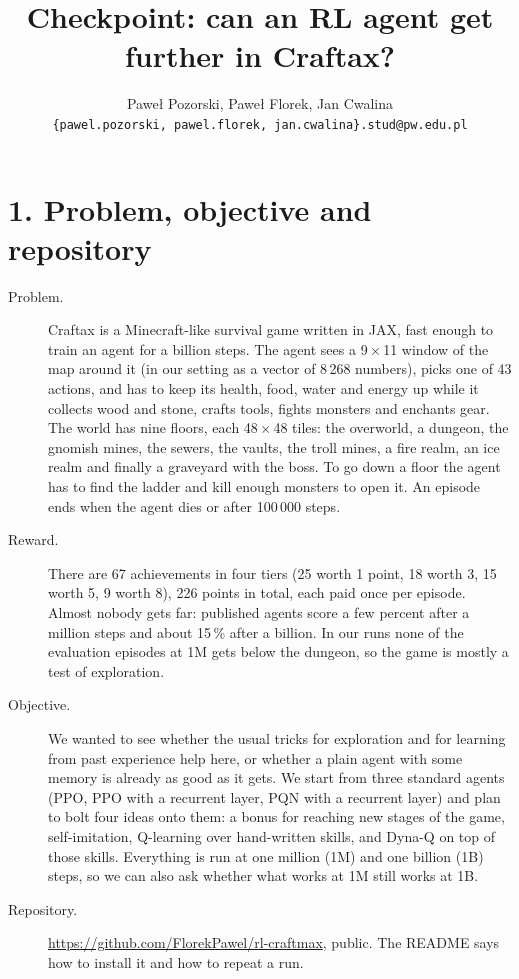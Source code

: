 \documentclass[10pt,a4paper]{article}
\title{Checkpoint: can an RL agent get further in Craftax?}
\author{Pawe{\l} Pozorski, Pawe{\l} Florek, Jan Cwalina\\{\small\texttt{\{pawel.pozorski, pawel.florek, jan.cwalina\}.stud@pw.edu.pl}}}
\date{}
\begin{document}
\small
\maketitle
\vspace{-1.6em}

\section*{1. Problem, objective and repository}

\begin{description}
\item[Problem.] Craftax is a Minecraft-like survival game written in JAX, fast enough to train an agent for a billion steps. The agent sees a 9\,$\times$\,11 window of the map around it (in our setting as a vector of 8\,268 numbers), picks one of 43 actions, and has to keep its health, food, water and energy up while it collects wood and stone, crafts tools, fights monsters and enchants gear. The world has nine floors, each 48\,$\times$\,48 tiles: the overworld, a dungeon, the gnomish mines, the sewers, the vaults, the troll mines, a fire realm, an ice realm and finally a graveyard with the boss. To go down a floor the agent has to find the ladder and kill enough monsters to open it. An episode ends when the agent dies or after 100\,000 steps.
\item[Reward.] There are 67 achievements in four tiers (25 worth 1 point, 18 worth 3, 15 worth 5, 9 worth 8), 226 points in total, each paid once per episode. Almost nobody gets far: published agents score a few percent after a million steps and about 15\,\% after a billion. In our runs none of the evaluation episodes at 1M gets below the dungeon, so the game is mostly a test of exploration.
\item[Objective.] We wanted to see whether the usual tricks for exploration and for learning from past experience help here, or whether a plain agent with some memory is already as good as it gets. We start from three standard agents (PPO, PPO with a recurrent layer, PQN with a recurrent layer) and plan to bolt four ideas onto them: a bonus for reaching new stages of the game, self-imitation, Q-learning over hand-written skills, and Dyna-Q on top of those skills. Everything is run at one million (1M) and one billion (1B) steps, so we can also ask whether what works at 1M still works at 1B.
\item[Repository.] \url{https://github.com/FlorekPawel/rl-craftmax}, public. The README says how to install it and how to repeat a run.
\end{description}
\end{document}

